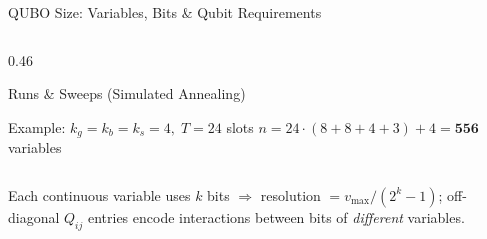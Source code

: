 \documentclass[aspectratio=169]{beamer}
\begin{document}
\begin{frame}{QUBO Size: Variables, Bits \& Qubit Requirements}
\begin{columns}[t]
\begin{column}{0.46\textwidth}
\begin{block}{Runs \& Sweeps (Simulated Annealing)}
\end{block}
\vspace{0.15cm}
\begin{block}{Example: $k_g\!=\!k_b\!=\!k_s\!=\!4,\;T\!=\!24$ slots}
\footnotesize
$n = 24\cdot(8+8+4+3)+4 = \mathbf{556}$ variables
\end{block}
\end{column}
\end{columns}
\vspace{0.1cm}
{\footnotesize\centering
Each continuous variable uses $k$ bits $\Rightarrow$ resolution $= v_{\max}/(2^k-1)$;
off-diagonal $Q_{ij}$ entries encode interactions between bits of \emph{different} variables.\par}
\end{frame}

\end{document}
